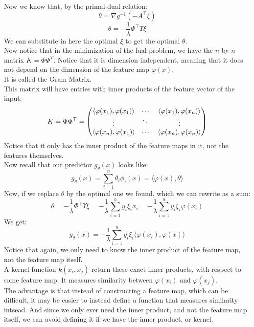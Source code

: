 \documentclass[12pt]{article}
\begin{document}
Now we know that, by the primal-dual relation:
\[ \theta = \nabla g^{-1}(-A^\top \xi) \]
\[ \theta = -\frac{1}{\lambda} \Phi^\top \Upsilon \xi \]
We can substitute in here the optimal $\xi$
to get the optimal $\theta$. \\

Now notice that in the minimization
of the fual problem,
we have the $n$ by $n$ matrix $K = \Phi\Phi^T$.
Notice that it is dimension independent,
meaning that it does not depend on the dimension
of the feature map $\varphi(x)$. \\
It is called the Gram Matrix. \\

This matrix will have entries with inner products
of the feature vector of the input:
\[ K = \Phi \Phi^\top = 
\begin{pmatrix} \langle \varphi(x_1), \varphi(x_1) \rangle 
& \cdots & \langle \varphi(x_1), \varphi(x_n) \rangle \\
\vdots & \ddots & \vdots \\
\langle \varphi(x_n), \varphi(x_1) \rangle & \cdots 
& \langle \varphi(x_n), \varphi(x_n) \rangle \end{pmatrix} \]
Notice that it only has the inner product
of the feature maps in it, not the features 
themselves. \\

Now recall that our predictor $g_\theta(x)$
looks like:
\[ g_\theta(x) = \sum_{i=1}^n \theta_i \phi_i(x) = 
\langle \varphi(x), \theta \rangle \]
Now, if we replace $\theta$ by the optimal one we found,
which we can rewrite as a sum:
\[ \theta = -\frac{1}{\lambda} \Phi^\top \Upsilon \xi
= -\frac{1}{\lambda} \sum_{i=1}^n y_i \xi_i x_i = 
-\frac{1}{\lambda} \sum_{i=1}^n y_i \xi_i \varphi(x_i) \]
We get:
\[ g_{\theta}(x)
= - \frac{1}{\lambda} \sum_{i=1}^n y_i \xi_i 
\langle \varphi(x_i), \varphi(x) \rangle \]
Notice that again, we only need to know the
inner product of the feature map, not the
feature map itself. \\

A kernel function $k(x_i, x_j)$
return these exact inner products,
with respect to some feature map.
It measures similarity between $\varphi(x_i)$ 
and $\varphi(x_j)$. \\

The advantage is that instead of constructing
a feature map, which can be difficult, it may be
easier to instead define a function that measures
similarity intsead. And since we only ever need
the inner product, and not the feature map itself,
we can avoid defining it if we have the inner product,
or kernel. \\
\end{document}
